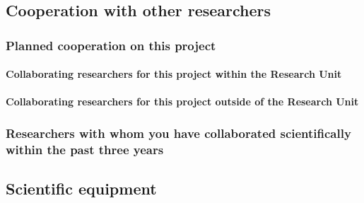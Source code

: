 \documentclass[10pt,fleqn,twoside]{article}
\begin{document}
\todo{[Text]}

\subsection{Cooperation with other researchers}

\subsubsection{Planned cooperation on this project}

\paragraph{Collaborating researchers for this project within the
  Research Unit}


\paragraph{Collaborating researchers for this project outside of
  the Research Unit}



\subsubsection{Researchers with whom you have collaborated scientifically within the past three years}


\subsection{Scientific equipment}
\end{document}
